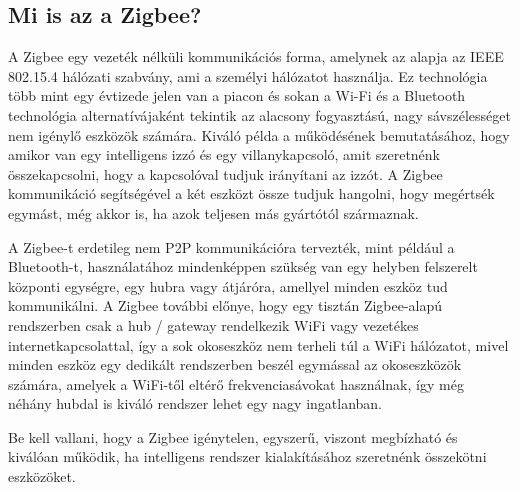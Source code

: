 \subsection{Mi is az a Zigbee?}
A Zigbee egy vezeték nélküli kommunikációs forma, amelynek az alapja az IEEE 802.15.4 hálózati szabvány, ami a személyi hálózatot használja. Ez technológia több mint egy évtizede jelen van a piacon és sokan a Wi-Fi és a Bluetooth technológia alternatívájaként tekintik az alacsony fogyasztású, nagy sávszélességet nem igénylő eszközök számára.
Kiváló példa a működésének bemutatásához, hogy amikor van egy intelligens izzó és egy villanykapcsoló, amit szeretnénk összekapcsolni, hogy a kapcsolóval tudjuk irányítani az izzót. A Zigbee kommunikáció segítségével a két eszközt össze tudjuk hangolni, hogy megértsék egymást, még akkor is, ha azok teljesen más gyártótól származnak.
\par A Zigbee-t erdetileg nem P2P kommunikációra tervezték, mint például a Bluetooth-t, használatához mindenképpen szükség van egy helyben felszerelt központi egységre, egy hubra vagy átjáróra, amellyel minden eszköz tud kommunikálni.
A Zigbee további előnye, hogy egy tisztán Zigbee-alapú rendszerben csak a hub / gateway rendelkezik WiFi vagy vezetékes internetkapcsolattal, így a sok okoseszköz nem terheli túl a WiFi hálózatot, mivel minden eszköz egy dedikált rendszerben beszél egymással az okoseszközök számára, amelyek a WiFi-től eltérő frekvenciasávokat használnak, így még néhány hubdal is kiváló rendszer lehet egy nagy ingatlanban.
\par Be kell vallani, hogy a Zigbee igénytelen, egyszerű, viszont megbízható és kiválóan működik, ha intelligens rendszer kialakításához szeretnénk összekötni eszközöket.\cite{4127535}

\subsubsection{}
